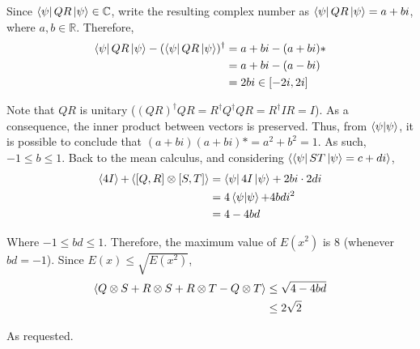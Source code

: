 Since $\bra{\psi} QR \ket{\psi} \in \mathbb{C}$,
write the resulting complex number as
$\bra{\psi} QR \ket{\psi} = a + bi$,
where $a, b \in \mathbb{R}$.
Therefore,
\begin{align}
    \bra{\psi}QR\ket{\psi} - (\bra{\psi} QR \ket{\psi})^\dagger
    &= a + bi - (a + bi)* \\
    &= a + bi - (a - bi) \\
    &= 2bi \in [-2i, 2i]
\end{align}

Note that $QR$ is unitary
($(QR)^\dagger QR = R^\dagger Q^\dagger Q R = R^\dagger I R = I$).
As a consequence, the inner product between vectors is preserved.
Thus, from $\mathop{\mathinner{ \langle{\psi}|{\psi}\rangle}}$,
it is possible to conclude that
$(a + bi)(a + bi)* = a^2 + b^2 = 1$.
As such, $-1 \leq b \leq 1$.
Back to the mean calculus,
and considering $\mathop{\mathinner{ \langle {\bra{\psi} ST \Ket{\psi} = c + di} \rangle}}$,
\begin{align}
    \mathop{\mathinner{ \langle {4I} \rangle}} + \mathop{\mathinner{ \langle {[Q, R] \otimes [S, T]} \rangle}} &=
        \bra{\psi} 4I \ket{\psi} + 2bi \cdot 2di \\
	&= 4 \mathop{\mathinner{ \langle{\psi}|{\psi}\rangle}} + 4 bd i^2 \\
	&= 4 - 4 bd
\end{align}

Where $-1 \leq bd \leq 1$.
Therefore, the maximum value of $E(x^2)$ is 8 (whenever $bd = -1$).
Since $E(x) \leq \sqrt{E(x^2)}$,
\begin{align}
	\mathop{\mathinner{ \langle {Q \otimes S + R \otimes S + R \otimes T - Q \otimes T} \rangle}} &\leq
		\sqrt{4 - 4bd} \\
	&\leq 2 \sqrt2
\end{align}

As requested.